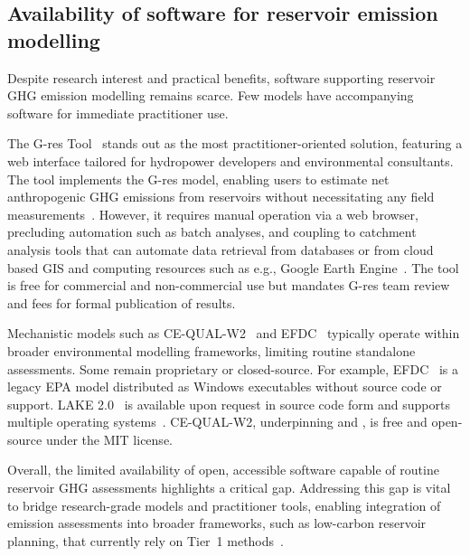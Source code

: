 \documentclass[final,1p,times]{elsarticle}
\begin{document}
\subsection{Availability of software for reservoir emission modelling}
\label{subsec:software_and_code}

Despite research interest and practical benefits, software supporting reservoir \ac{GHG} emission modelling remains scarce. 
Few models have accompanying software for immediate practitioner use.

The G-res Tool~\citep{prairie2017gres, Prairie2017b} stands out as the most practitioner-oriented solution, featuring a web interface tailored for hydropower developers and environmental consultants. 
The tool implements the G-res model, enabling users to estimate net anthropogenic \ac{GHG} emissions from reservoirs without necessitating any field measurements~\citep{Prairie2021}. 
However, it requires manual operation via a web browser, precluding automation such as batch analyses, and coupling to catchment analysis tools that can automate data retrieval from databases or from cloud based \ac{GIS} and computing resources such as e.g., Google Earth Engine~\cite{Gorelick2017}.
The tool is free for commercial and non-commercial use but mandates G-res team review and fees for formal publication of results.

Mechanistic models such as CE-QUAL-W2~\citep{Berger2014} and \ac{EFDC}~\citep{SHI2025} typically operate within broader environmental modelling frameworks, limiting routine standalone assessments. 
Some remain proprietary or closed-source. 
For example, \ac{EFDC}~\cite{hamrick1992} is a legacy EPA model distributed as Windows executables without source code or support. 
LAKE 2.0~\citep{Lomov2024} is available upon request in source code form and supports multiple operating systems~\citep{Stepanenko2016}. 
CE-QUAL-W2, underpinning \citet{Berger2014} and \citet{Wu2022}, is free and open-source under the MIT license.

Overall, the limited availability of open, accessible software capable of routine reservoir \ac{GHG} assessments highlights a critical gap. 
Addressing this gap is vital to bridge research-grade models and practitioner tools, enabling integration of emission assessments into broader frameworks, such as low-carbon reservoir planning, that currently rely on Tier~1 methods~\cite{Almeida2019, Carlino2024, Tangi2024}.
\end{document}
